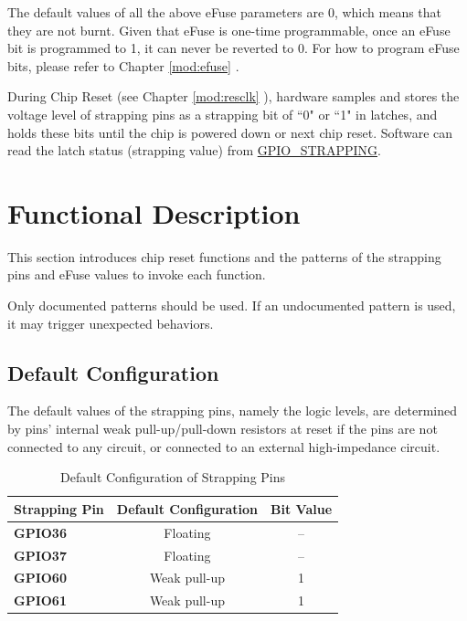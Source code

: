 \documentclass[main\_\_EN.tex]{subfiles}
\begin{document}
The default values of all the above eFuse parameters are 0, which means that they are not burnt. Given that eFuse is one-time programmable, once an eFuse bit is programmed to 1, it can never be reverted to 0. For how to program eFuse bits, please refer to Chapter \ref{mod:efuse} \textit{}.

During Chip Reset (see Chapter \ref{mod:resclk} \textit{}), hardware samples and stores the voltage level of strapping pins as a strapping bit of ``0" or ``1" in latches, and holds these bits until the chip is powered down or next chip reset. Software can read the latch status (strapping value) from \hyperref[fielddesc:GPIOSTRAPPING]{GPIO\_STRAPPING}.

\section{Functional Description}
\label{sec:bootctrl-func-descr}

This section introduces chip reset functions and the patterns of the strapping pins and eFuse values to invoke each function.

\begin{importantlisting}
Only documented patterns should be used. If an undocumented pattern is used, it may trigger unexpected behaviors.
\end{importantlisting}

\subsection{Default Configuration}

The default values of the strapping pins, namely the logic levels, are determined by pins' internal weak pull-up/pull-down resistors at reset if the pins are not connected to any circuit, or connected to an external high-impedance circuit.

\begin{table}[H]
    \centering
    \caption{Default Configuration of Strapping Pins}
    \label{tab:bootctrl-default-config-strapping-pins}
    \begin{tabular}{ | l | c | c | }
    \hline
        \rowcolor{lightgray}
        \textbf{Strapping Pin} & \textbf{Default Configuration} & \textbf{Bit Value} \\\hline
        \textbf{GPIO36}  & Floating & -- \\\hline
        \textbf{GPIO37}  & Floating & -- \\\hline
        \textbf{GPIO60}  & Weak pull-up & 1 \\\hline
        \textbf{GPIO61}  & Weak pull-up & 1 \\\hline
    \end{tabular}
\end{table}
\end{document}
